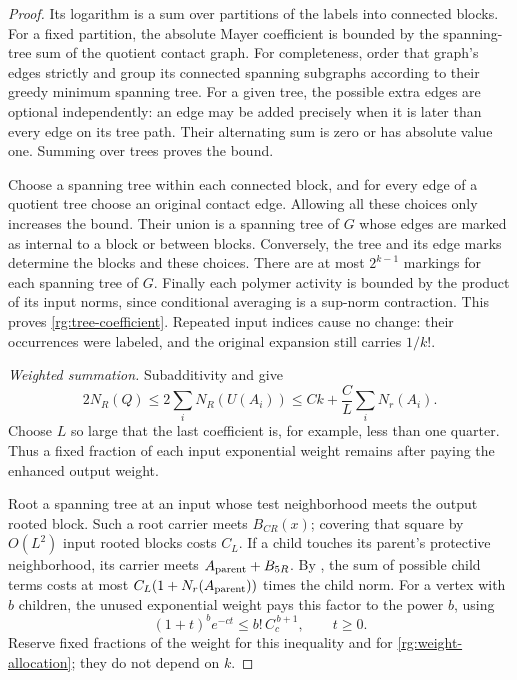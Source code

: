 \begin{proof}
Its logarithm is a sum over partitions of the labels into connected
blocks.  For a fixed partition, the absolute Mayer coefficient is bounded
by the spanning-tree sum of the quotient contact graph.  For completeness,
order that graph's edges strictly and group its connected spanning
subgraphs according to their greedy minimum spanning tree.  For a given
tree, the possible extra edges are optional independently: an edge may be
added precisely when it is later than every edge on its tree path.  Their
alternating sum is zero or has absolute value one.  Summing over trees
proves the bound.

Choose a spanning tree within each connected block, and for every edge
of a quotient tree choose an original contact edge.  Allowing all these
choices only increases the bound.  Their union is a spanning tree of
$G$ whose edges are marked as internal to a block or between blocks.
Conversely, the tree and its edge marks determine the blocks and these
choices.  There are at most $2^{k-1}$ markings for each spanning tree of
$G$.  Finally each polymer activity is bounded by the product of its
input norms, since conditional averaging is a sup-norm contraction.
This proves \eqref{rg:tree-coefficient}.  Repeated input indices cause no
change: their occurrences were labeled, and the original expansion still
carries $1/k!$.

\emph{Weighted summation.}
Subadditivity and  give
\begin{equation}
 2N_R(Q)\le 2\sum_iN_R(U(A_i))
       \le Ck+\frac{C}{L}\sum_iN_r(A_i).
 \label{rg:weight-allocation}
\end{equation}
Choose $L$ so large that the last coefficient is, for example, less than
one quarter.  Thus a fixed fraction of each input exponential weight
remains after paying the enhanced output weight.

Root a spanning tree at an input whose test neighborhood meets the
output rooted block.  Such a root carrier meets $B_{CR}(x)$; covering that
square by $O(L^2)$ input rooted blocks costs $C_L$.  If a child touches its
parent's protective neighborhood, its carrier meets
$A_{\rm parent}+B_{5R}$.  By , the sum of possible child
terms costs at most $C_L(1+N_r(A_{\rm parent}))$ times the child norm.
For a vertex with $b$ children, the unused exponential weight pays this
factor to the power $b$, using
\[
 (1+t)^b e^{-ct}\le b!\,C_c^{\,b+1},\qquad t\ge0.
\]
Reserve fixed fractions of the weight for this inequality and for
\eqref{rg:weight-allocation}; they do not depend on $k$.


\end{proof}
